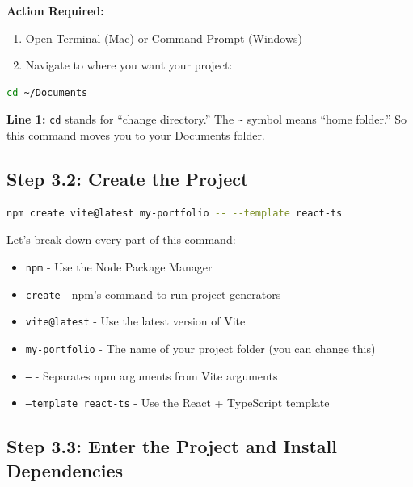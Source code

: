 \documentclass[12pt,a4paper]{article}
\begin{document}
\textbf{Action Required:}
\begin{enumerate}
    \item Open Terminal (Mac) or Command Prompt (Windows)
    \item Navigate to where you want your project:
\end{enumerate}

\begin{lstlisting}[language=bash,caption={Navigate to your desired folder}]
cd ~/Documents
\end{lstlisting}

\begin{explanation}
\textbf{Line 1:} \texttt{cd} stands for ``change directory.'' The \texttt{\~} symbol means ``home folder.'' So this command moves you to your Documents folder.
\end{explanation}

\subsection{Step 3.2: Create the Project}

\begin{lstlisting}[language=bash,caption={Create a new React + TypeScript project}]
npm create vite@latest my-portfolio -- --template react-ts
\end{lstlisting}

\begin{explanation}
Let's break down every part of this command:

\begin{itemize}
    \item \texttt{npm} - Use the Node Package Manager
    \item \texttt{create} - npm's command to run project generators
    \item \texttt{vite@latest} - Use the latest version of Vite
    \item \texttt{my-portfolio} - The name of your project folder (you can change this)
    \item \texttt{--} - Separates npm arguments from Vite arguments
    \item \texttt{--template react-ts} - Use the React + TypeScript template
\end{itemize}
\end{explanation}

\subsection{Step 3.3: Enter the Project and Install Dependencies}
\end{document}
